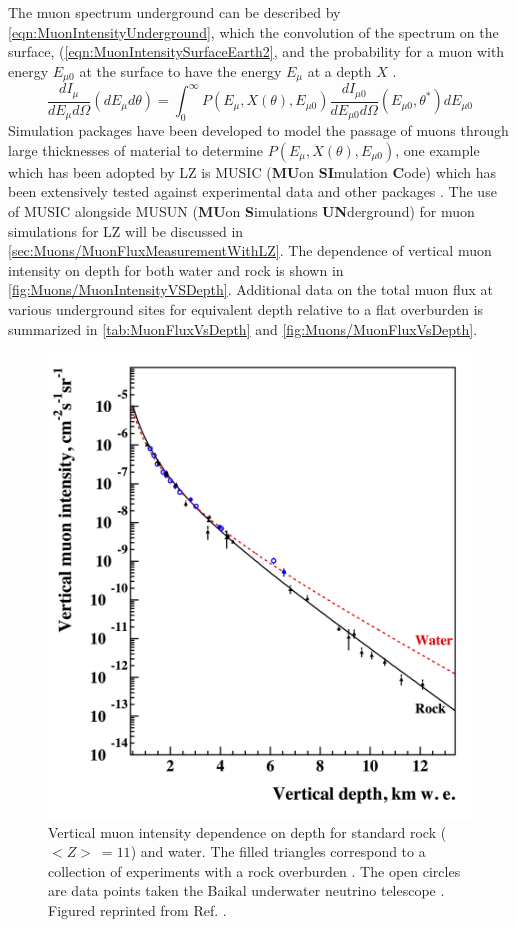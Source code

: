 The muon spectrum underground can be described by \autoref{eqn:MuonIntensityUnderground}, which the convolution of the spectrum on the surface, (\autoref{eqn:MuonIntensitySurfaceEarth2}, and the probability for a muon with energy $E_{\mu 0}$ at the surface to have the energy $E_\mu$ at a depth $X$ \cite{musun}.
\begin{equation}\label{eqn:MuonIntensityUnderground}
    \frac{dI_\mu}{dE_\mu d\Omega}(dE_\mu d\theta)=\int^\infty_0P(E_\mu,X(\theta),E_{\mu0})\frac{dI_{\mu0}}{dE_{\mu0}d\Omega}(E_{\mu0},\theta^*)dE_{\mu 0}
\end{equation}
Simulation packages have been developed to model the passage of muons through large thicknesses of material to determine $P(E_\mu,X(\theta),E_{\mu0})$, one example which has been adopted by LZ is MUSIC (\textbf{MU}on \textbf{SI}mulation \textbf{C}ode) which has been extensively tested against experimental data and other packages \cite{musun,LVD:1998lir,PhysRevD.60.112001,Tang:2006uu,MACRO:2003qix}. The use of MUSIC alongside MUSUN (\textbf{MU}on \textbf{S}imulations \textbf{UN}derground) for muon simulations for LZ will be discussed in \autoref{sec:Muons/MuonFluxMeasurementWithLZ}.
The dependence of vertical muon intensity on depth for both water and rock is shown in \autoref{fig:Muons/MuonIntensityVSDepth}. Additional data on the total muon flux at various underground sites for equivalent depth relative to a flat overburden is summarized in \autoref{tab:MuonFluxVsDepth} and \autoref{fig:Muons/MuonFluxVsDepth}.
\begin{figure}[ht!]
    \centering
    \includegraphics[width=0.7\linewidth]{figures/Muons/MuonIntensityVSVertDepth.png}
    \caption{Vertical muon intensity dependence on depth for standard rock ($<Z>\:=11$) and water. The filled triangles correspond to a collection of experiments with a rock overburden \cite{Kozyarivsky:1988gxn}. The open circles are data points taken the Baikal underwater neutrino telescope \cite{BAIKAL:1997iok}. Figured reprinted from Ref. \cite{dwoodward:thesis}.}
    \label{fig:Muons/MuonIntensityVSDepth}
\end{figure}
